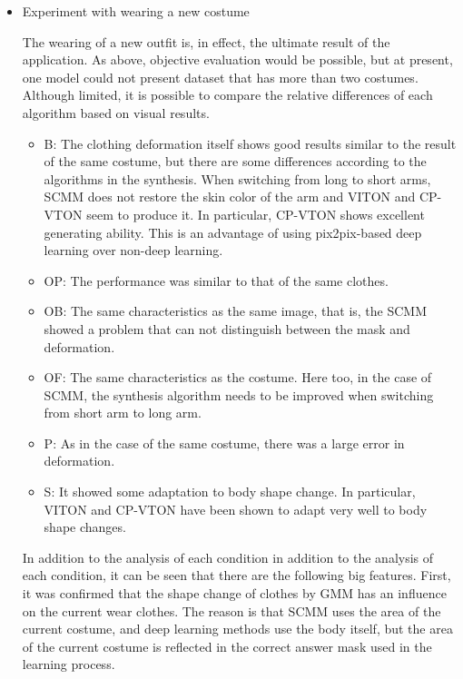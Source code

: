 \begin{itemize}
\item Experiment with wearing a new costume
 
The wearing of a new outfit is, in effect, the ultimate result of the application. As above, objective evaluation would be possible, but at present, one model could not present dataset that has more than two costumes. Although limited, it is possible to compare the relative differences of each algorithm based on visual results.


\begin{itemize}

\item B: The clothing deformation itself shows good results similar to the result of the same costume, but there are some differences according to the algorithms in the synthesis. When switching from long to short arms, SCMM does not restore the skin color of the arm and VITON and CP-VTON seem to produce it. In particular, CP-VTON shows excellent generating ability. This is an advantage of using pix2pix-based deep learning over non-deep learning.
\item OP: The performance was similar to that of the same clothes.
\item OB: The same characteristics as the same image, that is, the SCMM showed a problem that can not distinguish between the mask and deformation.
\item OF: The same characteristics as the costume. Here too, in the case of SCMM, the synthesis algorithm needs to be improved when switching from short arm to long arm.
\item P: As in the case of the same costume, there was a large error in deformation.
\item S: It showed some adaptation to body shape change. In particular, VITON and CP-VTON have been shown to adapt very well to body shape changes.

\end{itemize}

In addition to the analysis of each condition in addition to the analysis of each condition, it can be seen that there are the following big features. First, it was confirmed that the shape change of clothes by GMM has an influence on the current wear clothes. The reason is that SCMM uses the area of the current costume, and deep learning methods use the body itself, but the area of the current costume is reflected in the correct answer mask used in the learning process.

\end{itemize}


